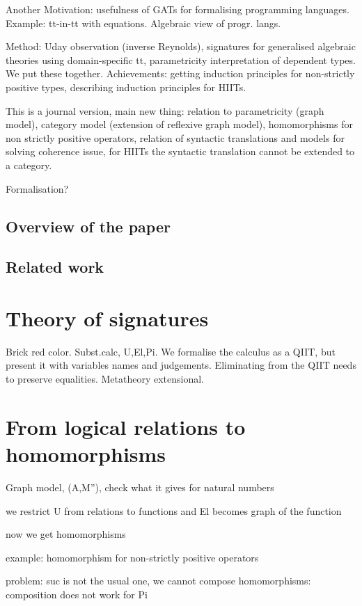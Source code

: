 \documentclass{lmcs} %
\theoremstyle{plain}\newtheorem{satz}[thm]{Satz} %
\begin{document}
Another Motivation: usefulness of GATs for formalising programming
languages. Example: tt-in-tt with equations. Algebraic view of
progr. langs.

Method: Uday observation (inverse Reynolds), signatures for
generalised algebraic theories using domain-specific tt, parametricity
interpretation of dependent types. We put these
together. Achievements: getting induction principles for non-strictly
positive types, describing induction principles for HIITs.

This is a journal version, main new thing: relation to parametricity
(graph model), category model (extension of reflexive graph model),
homomorphisms for non strictly positive operators, relation of
syntactic translations and models for solving coherence issue, for
HIITs the syntactic translation cannot be extended to a category.

Formalisation?

\subsection*{Overview of the paper}

\subsection*{Related work}

\section*{Theory of signatures}

Brick red color. Subst.calc, U,El,Pi. We formalise the calculus as a
QIIT, but present it with variables names and judgements. Eliminating
from the QIIT needs to preserve equalities. Metatheory extensional.

\section*{From logical relations to homomorphisms}

Graph model, (A,M''), check what it gives for natural numbers

we restrict U from relations to functions and El becomes graph of the
function

now we get homomorphisms

example: homomorphism for non-strictly positive operators

problem: suc is not the usual one, we cannot compose homomorphisms:
composition does not work for Pi
\end{document}
